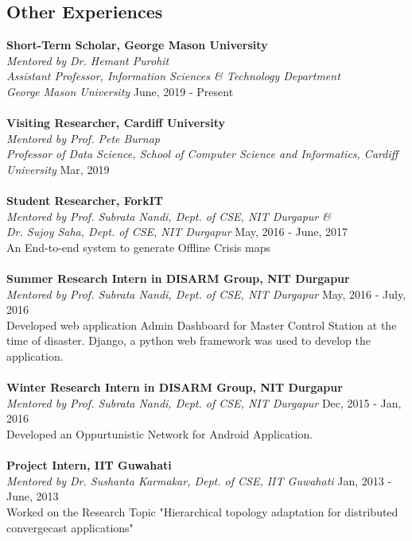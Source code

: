 \documentclass[margin, centered]{res}
\begin{document}
\begin{resume}
\section{Other Experiences}
\textbf{Short-Term Scholar, George Mason University} \\
\emph{Mentored by Dr. Hemant Purohit\\
Assistant Professor, Information Sciences \& Technology Department \\ George Mason University} \hfill June, 2019 - Present \\
\\
\textbf{Visiting Researcher, Cardiff University} \\
\emph{Mentored by Prof. Pete Burnap \\ Professor of Data Science, School of Computer Science and Informatics, Cardiff University} \hfill Mar, 2019 \\
\\
\textbf{Student Researcher, ForkIT} \\
\emph{Mentored by {Prof. Subrata Nandi, Dept. of CSE, NIT Durgapur} \& \\ {Dr. Sujoy Saha, Dept. of CSE, NIT Durgapur}} \hfill May, 2016 - June, 2017 \\
An End-to-end system to generate Offline Crisis maps \\
\\
\textbf{Summer Research Intern in DISARM Group, NIT Durgapur} \\
\emph{Mentored by {Prof. Subrata Nandi, Dept. of CSE, NIT Durgapur}} \hfill May, 2016 - July, 2016 \\
Developed web application Admin Dashboard for Master Control Station at the time of disaster. Django, a python web framework was used to develop the application.\\
\\
\textbf{Winter Research Intern in DISARM Group, NIT Durgapur} \\
\emph{Mentored by {Prof. Subrata Nandi, Dept. of CSE, NIT Durgapur}} \hfill Dec, 2015 - Jan, 2016 \\
Developed an Oppurtunistic Network for Android Application.
\\
\\
\textbf{Project Intern, IIT Guwahati}  \\
\emph{Mentored by {Dr. Sushanta Karmakar, Dept. of CSE, IIT Guwahati}} \hfill Jan, 2013 - June, 2013 \\
Worked on the Research Topic "Hierarchical topology adaptation for distributed convergecast applications"



\end{resume}
\end{document}
